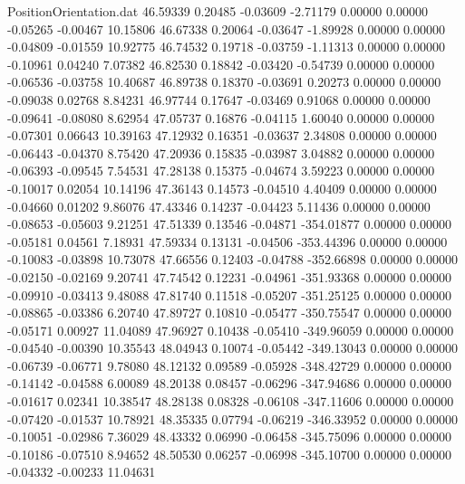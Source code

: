 \begin{filecontents}{PositionOrientation.dat}
  46.59339    0.20485   -0.03609    -2.71179    0.00000    0.00000   -0.05265   -0.00467   10.15806
  46.67338    0.20064   -0.03647    -1.89928    0.00000    0.00000   -0.04809   -0.01559   10.92775
  46.74532    0.19718   -0.03759    -1.11313    0.00000    0.00000   -0.10961    0.04240    7.07382
  46.82530    0.18842   -0.03420    -0.54739    0.00000    0.00000   -0.06536   -0.03758   10.40687
  46.89738    0.18370   -0.03691     0.20273    0.00000    0.00000   -0.09038    0.02768    8.84231
  46.97744    0.17647   -0.03469     0.91068    0.00000    0.00000   -0.09641   -0.08080    8.62954
  47.05737    0.16876   -0.04115     1.60040    0.00000    0.00000   -0.07301    0.06643   10.39163
  47.12932    0.16351   -0.03637     2.34808    0.00000    0.00000   -0.06443   -0.04370    8.75420
  47.20936    0.15835   -0.03987     3.04882    0.00000    0.00000   -0.06393   -0.09545    7.54531
  47.28138    0.15375   -0.04674     3.59223    0.00000    0.00000   -0.10017    0.02054   10.14196
  47.36143    0.14573   -0.04510     4.40409    0.00000    0.00000   -0.04660    0.01202    9.86076
  47.43346    0.14237   -0.04423     5.11436    0.00000    0.00000   -0.08653   -0.05603    9.21251
  47.51339    0.13546   -0.04871  -354.01877    0.00000    0.00000   -0.05181    0.04561    7.18931
  47.59334    0.13131   -0.04506  -353.44396    0.00000    0.00000   -0.10083   -0.03898   10.73078
  47.66556    0.12403   -0.04788  -352.66898    0.00000    0.00000   -0.02150   -0.02169    9.20741
  47.74542    0.12231   -0.04961  -351.93368    0.00000    0.00000   -0.09910   -0.03413    9.48088
  47.81740    0.11518   -0.05207  -351.25125    0.00000    0.00000   -0.08865   -0.03386    6.20740
  47.89727    0.10810   -0.05477  -350.75547    0.00000    0.00000   -0.05171    0.00927   11.04089
  47.96927    0.10438   -0.05410  -349.96059    0.00000    0.00000   -0.04540   -0.00390   10.35543
  48.04943    0.10074   -0.05442  -349.13043    0.00000    0.00000   -0.06739   -0.06771    9.78080
  48.12132    0.09589   -0.05928  -348.42729    0.00000    0.00000   -0.14142   -0.04588    6.00089
  48.20138    0.08457   -0.06296  -347.94686    0.00000    0.00000   -0.01617    0.02341   10.38547
  48.28138    0.08328   -0.06108  -347.11606    0.00000    0.00000   -0.07420   -0.01537   10.78921
  48.35335    0.07794   -0.06219  -346.33952    0.00000    0.00000   -0.10051   -0.02986    7.36029
  48.43332    0.06990   -0.06458  -345.75096    0.00000    0.00000   -0.10186   -0.07510    8.94652
  48.50530    0.06257   -0.06998  -345.10700    0.00000    0.00000   -0.04332   -0.00233   11.04631

\end{filecontents}
